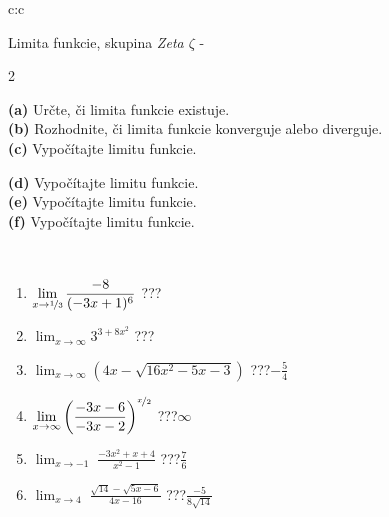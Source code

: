 \documentclass[10pt]{report}
\begin{document}
\begin{tabular}{c:c}
\begin{minipage}[c][104.5mm][t]{0.5\linewidth}
\begin{center}
\vspace{7mm}
{\huge Limita funkcie, skupina \textit{Zeta $\zeta$} -}\\[5mm]
\begin{minipage}{0.95\linewidth}
\begin{center}
{\small \begin{multicols}{2} \raggedright
\textbf{(a)} Určte, či limita funkcie existuje. \\[1mm]
\textbf{(b)} Rozhodnite, či limita funkcie konverguje alebo diverguje. \\[1mm]
\textbf{(c)} Vypočítajte limitu funkcie. \par \columnbreak
\textbf{(d)} Vypočítajte limitu funkcie. \\[1mm]
\textbf{(e)} Vypočítajte limitu funkcie. \\[1mm]
\textbf{(f)} Vypočítajte limitu funkcie. \\[1mm]
\end{multicols}
}
\end{center}
\end{minipage}
\\[4mm]
\begin{minipage}{0.79\linewidth}
\begin{center}
\begin{varwidth}{\linewidth}
\begin{enumerate}
\normalsize
\item $\displaystyle\lim_{x\to\nicefrac{1}{3}}{\frac{-8}{(-3x+1)^{6}}}$\quad \dotfill\; ???\;\dotfill \quad {}
\item $\displaystyle\lim_{x\to\infty}{3^{3+8x^2}}$\quad \dotfill\; ???\;\dotfill \quad {}
\item $\displaystyle\lim_{x\to\infty}{\left(4x - \sqrt{16x^2-5x-3}\right)}$\quad \dotfill\; ???\;\dotfill \quad $-\frac{5}{4}$
\item $\displaystyle\lim_{x\to\infty}{\left( \frac{-3x-6}{-3x-2} \right)^{\nicefrac{x}{2}}}$\quad \dotfill\; ???\;\dotfill \quad $\infty$
\item $\displaystyle\lim_{x\to -1}{\;\frac{-3x^2+x+4}{x^2-1}}$\quad \dotfill\; ???\;\dotfill \quad $\frac{7}{6}$
\item $\displaystyle\lim_{x\to 4}{\;\frac{\sqrt{14}-\sqrt{5x-6}}{4x-16}}$\quad \dotfill\; ???\;\dotfill \quad $\frac{-5}{8\sqrt{14}}$

\end{enumerate}
\end{varwidth}
\end{center}
\end{minipage}
\end{center}
\end{minipage}
\end{tabular}
\end{document}
